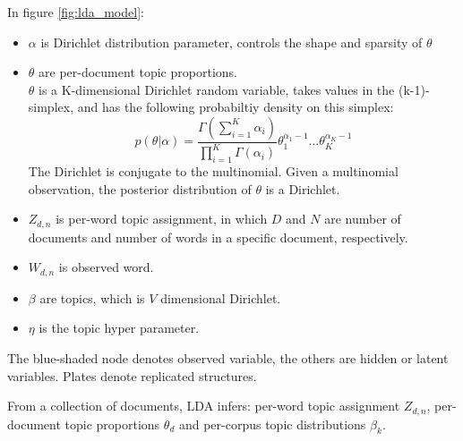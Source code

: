 \documentclass[conference,compsoc]{IEEEtran}
\begin{document}
In figure \ref{fig:lda_model}:
\begin{itemize}
	\item $\alpha$ is Dirichlet distribution parameter, controls the shape and sparsity of $\theta$
	\item $\theta$ are per-document topic proportions.\\
	$\theta$ is a K-dimensional Dirichlet random variable, takes values in the (k-1)-simplex, and has the following probabiltiy density on this simplex:
	\[p(\theta|\alpha)=\frac{\Gamma(\sum_{i=1}^{K}\alpha_i)}{\prod_{i=1}^{K}\Gamma(\alpha_i)}\theta_1^{\alpha_1-1}\dots\theta_K^{\alpha_K-1}\]
	The Dirichlet is conjugate to the multinomial. Given a multinomial observation, the posterior distribution of $\theta$ is a Dirichlet.
	\item $Z_{d,n}$ is per-word topic assignment, in which $D$ and $N$ are number of documents and number of words in a specific document, respectively.
	\item $W_{d,n}$ is observed word.
	\item $\beta$ are topics, which is $V$ dimensional Dirichlet.
	\item $\eta$ is the topic hyper parameter.
\end{itemize}

The blue-shaded node denotes observed variable, the others are hidden or latent variables. Plates denote replicated structures.

From a collection of documents, LDA infers: per-word topic assignment $Z_{d,n}$, per-document topic proportions $\theta_d$ and per-corpus topic distributions $\beta_k$.
\end{document}
